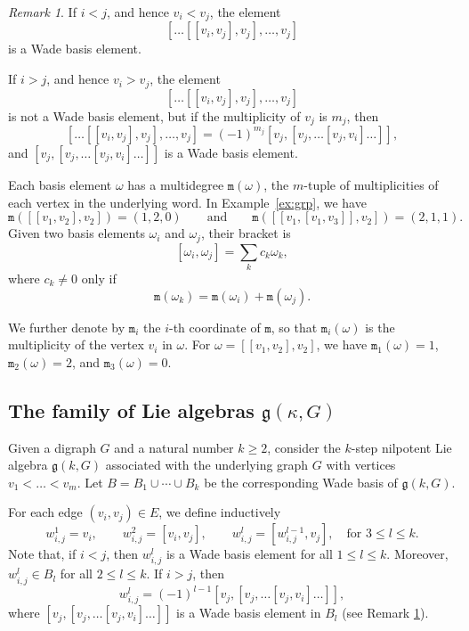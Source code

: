 \documentclass[a4paper,11pt]{amsart}
\theoremstyle{definition}
\theoremstyle{remark}
\newtheorem{remark}[theorem]{Remark}
\numberwithin{equation}{section}
\newcommand{\g}{\mathfrak{g}}
\newcommand{\mult}{\mathtt{m}}
\begin{document}
\begin{remark}\label{rmk:basis1}
If $i<j$, and hence $v_i<v_j$, the element
\[
[\dots [[v_i,v_j],v_j],\dots,v_j]
\]
is a Wade basis element.

If \(i>j\), and hence $v_i>v_j$, the element
\[
[\dots [[v_i,v_j],v_j],\dots,v_j]
\]
is not a Wade basis element, but if the multiplicity of $v_j$ is $m_j$, then
\[ 
[\dots [[v_i,v_j],v_j],\dots,v_j] = (-1)^{m_j} [v_j,[v_j,\dots[v_j,v_i]\dots]],
\]
and \([v_j,[v_j,\dots[v_j,v_i]\dots]]\) is a Wade basis element.


\end{remark}

\medskip

Each basis element $\omega$ has a multidegree $\mult(\omega)$, the $m$-tuple of multiplicities of each vertex in the underlying word. 
In Example~\ref{ex:grp}, we have
\[
\mult([[v_1,v_2],v_2])=(1,2,0)
\qquad\text{and}\qquad
\mult([[v_1, [v_1, v_3]], v_2])=(2,1,1).
\]
Given two basis elements $\omega_i$ and $\omega_j$, their bracket is
\[
[\omega_i,\omega_j]=\sum_k c_k \omega_k,
\]
where $c_k\ne 0$ only if
\begin{equation}\label{eqn:multidegree}
	\mult(\omega_k)= \mult(\omega_i)+\mult(\omega_j).
\end{equation}

We further denote by $\mult_i$ the $i$-th coordinate of $\mult$, so that $\mult_i(\omega)$ is the multiplicity of the vertex $v_i$ in $\omega$. For $\omega=[[v_1,v_2],v_2]$, we have $\mult_1(\omega)=1$, $\mult_2(\omega)=2$, and $\mult_3(\omega)=0$. 


\subsection{The family of Lie algebras $\g(\kappa,G)$}\label{subsec:g-kappa}

Given a digraph $G$ and a natural number $k\ge 2$, consider the $k$-step nilpotent Lie algebra $\g(k,G)$ associated with the underlying graph $G$
with vertices $v_1<\dots<v_m$.
Let $B = B_1 \cup \cdots \cup B_k$ be the corresponding Wade basis of $\g(k,G)$.

For each edge $(v_i,v_j)\in E$, we define inductively
\[
w_{i,j}^1=v_i, \qquad w_{i,j}^2=[v_i,v_j], \qquad w_{i,j}^{l}=[ w_{i,j}^{l-1},v_j], \quad \text{for } 3\leq l\leq k.
\]
Note that, if $i<j$, then $w_{i,j}^l$ is a Wade basis element for all $1\leq l\leq k$. 
Moreover, $w_{i,j}^l\in B_l$ for all $2\leq l\leq k$.
If $i>j$, then 
\[ w_{i,j}^l=(-1)^{l-1} [v_j,[v_j,\dots[v_j,v_i]\dots]], \] 
where $[v_j,[v_j,\dots[v_j,v_i]\dots]]$ is a Wade basis element in $B_l$ (see Remark \ref{rmk:basis1}).
\end{document}
